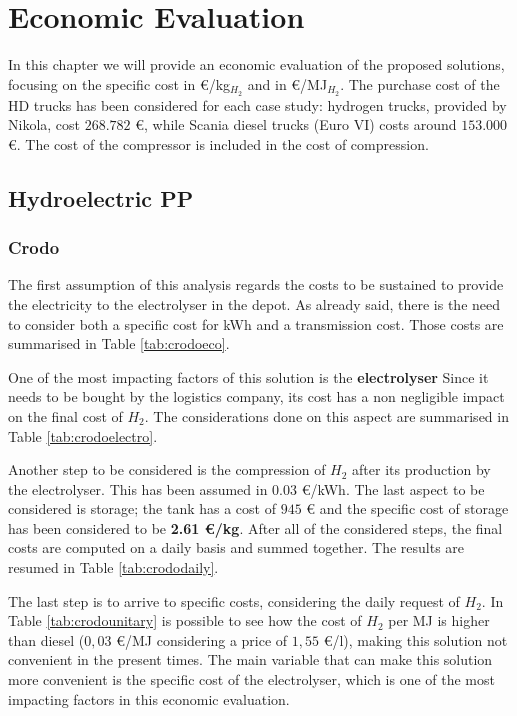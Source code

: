 \newpage
\chapter{Economic Evaluation}
In this chapter we will provide an economic evaluation of the proposed solutions, focusing on the specific cost in €/kg$_{H_2}$ and in €/MJ$_{H_2}$. The purchase cost of the HD trucks has been considered for each case study: hydrogen trucks, provided by Nikola, cost $268.782$ €, while Scania diesel trucks (Euro VI) costs around $153.000$ €. The cost of the compressor is included in the cost of compression.

\section{Hydroelectric PP}
\subsection{Crodo}
The first assumption of this analysis regards the costs to be sustained to provide the electricity to the electrolyser in the depot. As already said, there is the need to consider both a specific cost for kWh and a transmission cost. Those costs are summarised in Table \ref{tab:crodoeco}\textsuperscript{\cite{guanda20211}}.



One of the most impacting factors of this solution is the\textbf{ electrolyser }Since it needs to be bought by the logistics company, its cost has a non negligible impact on the final cost of $H_2$. The considerations done on this aspect are summarised in Table \ref{tab:crodoelectro}\textsuperscript{\cite{pianoidrogeno}}.



Another step to be considered is the compression of $H_2$ after its production by the electrolyser. This has been assumed in $0.03$ €/kWh\textsuperscript{\cite{guanda20211}}. The last aspect to be considered is storage; the tank has a cost of $945$ € and the specific cost of storage has been considered to be \textbf{2.61 €/kg}. After all of the considered steps, the final costs are computed on a daily basis and summed together. The results are resumed in Table \ref{tab:crododaily}.



The last step is to arrive to specific costs, considering the daily request of $H_2$. In Table \ref{tab:crodounitary} is possible to see how the cost of $H_2$ per MJ is higher than diesel ($0,03$ €/MJ considering a price of $1,55$ €/l), making this solution not convenient in the present times. The main variable that can make this solution more convenient is the specific cost of the electrolyser, which is one of the most impacting factors in this economic evaluation.

